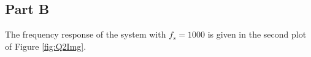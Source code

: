 \subsection{Part B}

The frequency response of the system with $f_s=1000$ is given in the second plot
of Figure \ref{fig:Q2Img}.
